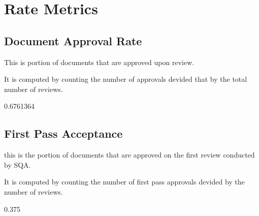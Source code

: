 \documentclass{article}
\begin{document}
\section{Rate Metrics}
\subsection{Document Approval Rate}
This is portion of documents that are approved upon review.

It is computed by counting the number of approvals devided that by the total number of reviews.

\begin{Schunk}
\begin{Soutput}
[1] 0.6761364
\end{Soutput}
\end{Schunk}

\subsection{First Pass Acceptance}
this is the portion of documents that are approved on the first review conducted
by SQA.

It is computed by counting the number of first pass approvals devided by
the number of reviews.

\begin{Schunk}
\begin{Soutput}
[1] 0.375
\end{Soutput}
\end{Schunk}
\end{document}

